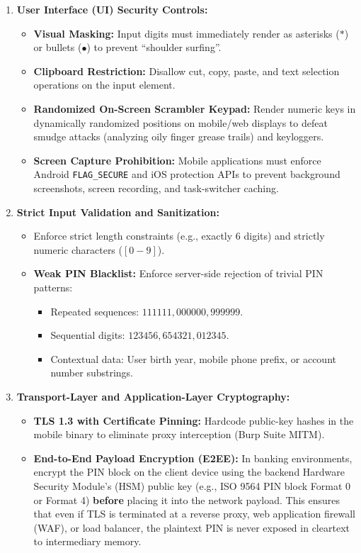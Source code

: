 \begin{enumerate}
\item \textbf{User Interface (UI) Security Controls:}
\begin{itemize}
\item \textbf{Visual Masking:} Input digits must immediately render as asterisks ($\ast$) or bullets ($\bullet$) to prevent ``shoulder surfing''.
\item \textbf{Clipboard Restriction:} Disallow cut, copy, paste, and text selection operations on the input element.
\item \textbf{Randomized On-Screen Scrambler Keypad:} Render numeric keys in dynamically randomized positions on mobile/web displays to defeat smudge attacks (analyzing oily finger grease trails) and keyloggers.
\item \textbf{Screen Capture Prohibition:} Mobile applications must enforce Android \texttt{FLAG\_SECURE} and iOS protection APIs to prevent background screenshots, screen recording, and task-switcher caching.
\end{itemize}

\item \textbf{Strict Input Validation and Sanitization:}
\begin{itemize}
\item Enforce strict length constraints (e.g., exactly 6 digits) and strictly numeric characters ($[0-9]$).
\item \textbf{Weak PIN Blacklist:} Enforce server-side rejection of trivial PIN patterns:
\begin{itemize}
\item Repeated sequences: $111111, 000000, 999999$.
\item Sequential digits: $123456, 654321, 012345$.
\item Contextual data: User birth year, mobile phone prefix, or account number substrings.
\end{itemize}
\end{itemize}

\item \textbf{Transport-Layer and Application-Layer Cryptography:}
\begin{itemize}
\item \textbf{TLS 1.3 with Certificate Pinning:} Hardcode public-key hashes in the mobile binary to eliminate proxy interception (Burp Suite MITM).
\item \textbf{End-to-End Payload Encryption (E2EE):} In banking environments, encrypt the PIN block on the client device using the backend Hardware Security Module's (HSM) public key (e.g., ISO 9564 PIN block Format 0 or Format 4) \textbf{before} placing it into the network payload. This ensures that even if TLS is terminated at a reverse proxy, web application firewall (WAF), or load balancer, the plaintext PIN is never exposed in cleartext to intermediary memory.
\end{itemize}


\end{enumerate}
